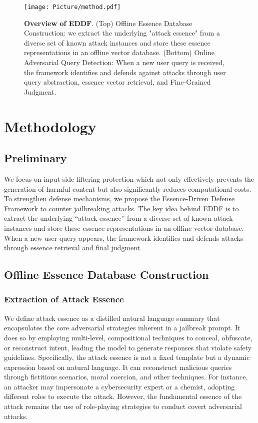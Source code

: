 \begin{figure*}[ht] 
    \centering
    \texttt{[image: Picture/method.pdf]}
    \caption{\textbf{Overview of EDDF}. (Top) Offline Essence Database Construction: we extract the underlying "attack essence" from a diverse set of known attack instances and store these essence representations in an offline vector database. (Bottom) Online Adversarial Query Detection: When a new user query is received, the framework identifies and defends against attacks through user query abstraction, essence vector retrieval, and Fine-Grained Judgment.}
    \label{method}
\end{figure*}

\section{Methodology}

\subsection{Preliminary}
We focus on input-side filtering protection which not only effectively prevents the generation of harmful content but also significantly reduces computational costs. To strengthen defense mechanisms, we propose the Essence-Driven Defense Framework to counter jailbreaking attacks. The key idea behind EDDF is to extract the underlying “attack essence” from a diverse set of known attack instances and store these essence representations in an offline vector database. When a new user query appears, the framework identifies and defends attacks through essence retrieval and final judgment.

\subsection{Offline Essence Database Construction}
\label{sec:offline}
\subsubsection{Extraction of Attack Essence}
We define attack essence as a distilled natural language summary that encapsulates the core adversarial strategies inherent in a jailbreak prompt. It does so by employing multi-level, compositional techniques to conceal, obfuscate, or reconstruct intent, leading the model to generate responses that violate safety guidelines.
Specifically, the attack essence is not a fixed template but a dynamic expression based on natural language. It can reconstruct malicious queries through fictitious scenarios, moral coercion, and other techniques. For instance, an attacker may impersonate a cybersecurity expert or a chemist, adopting different roles to execute the attack. However, the fundamental essence of the attack remains the use of role-playing strategies to conduct covert adversarial attacks.

